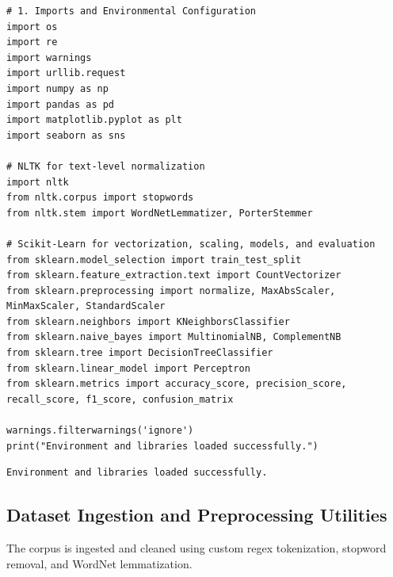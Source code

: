 \documentclass[12pt]{article}
\begin{document}
\begin{lstlisting}[style=code]
# 1. Imports and Environmental Configuration
import os
import re
import warnings
import urllib.request
import numpy as np
import pandas as pd
import matplotlib.pyplot as plt
import seaborn as sns

# NLTK for text-level normalization
import nltk
from nltk.corpus import stopwords
from nltk.stem import WordNetLemmatizer, PorterStemmer

# Scikit-Learn for vectorization, scaling, models, and evaluation
from sklearn.model_selection import train_test_split
from sklearn.feature_extraction.text import CountVectorizer
from sklearn.preprocessing import normalize, MaxAbsScaler, MinMaxScaler, StandardScaler
from sklearn.neighbors import KNeighborsClassifier
from sklearn.naive_bayes import MultinomialNB, ComplementNB
from sklearn.tree import DecisionTreeClassifier
from sklearn.linear_model import Perceptron
from sklearn.metrics import accuracy_score, precision_score, recall_score, f1_score, confusion_matrix

warnings.filterwarnings('ignore')
print("Environment and libraries loaded successfully.")
\end{lstlisting}

\begin{lstlisting}[style=output]
Environment and libraries loaded successfully.
\end{lstlisting}

\subsection{Dataset Ingestion and Preprocessing Utilities}
The corpus is ingested and cleaned using custom regex tokenization, stopword removal, and WordNet lemmatization.
\end{document}
